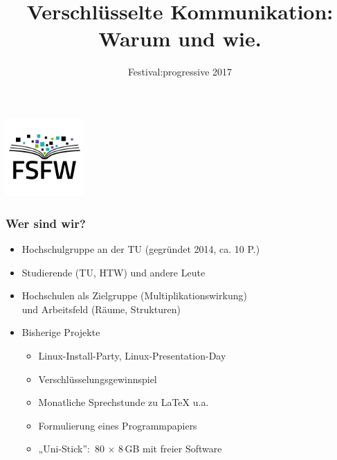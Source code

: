 \documentclass{beamer}
\title{Verschlüsselte Kommunikation: Warum und wie.}
\subtitle{Festival:progressive 2017}
\begin{document}
\begin{frame}
  \begin{center}%
    \includegraphics[width=3cm]{img-src/fsfw-logo-with-text.pdf}\\

    \vspace*{-0.5\baselineskip}

    \parbox{.95\columnwidth}{\centering\Large\inserttitle}

    \vspace*{\baselineskip}

    \structure{\large \insertsubtitle}
  \end{center}
\end{frame}

\begin{frame}[label=wb]

\begin{center}
 \vspace{10mm}
\end{center}
 
\end{frame}



\begin{frame}[label=ct1]
  \frametitle{Wer sind wir?}

  \onslide<+->

  \begin{itemize}
  \item Hochschulgruppe an der TU (gegründet 2014, ca. 10 P.)
  \item Studierende (TU, HTW) und andere Leute
  \item Hochschulen als Zielgruppe (Multiplikationswirkung)\\
    und Arbeitsfeld (Räume, Strukturen)

    \bigskip\onslide<+->

  \item Bisherige Projekte
    \begin{itemize}
    \item Linux-Install-Party, Linux-Presentation-Day
    \item Verschlüsselungsgewinnspiel
    \item Monatliche Sprechstunde zu \LaTeX{} u.a.
    \item Formulierung eines Programmpapiers
    \item „Uni-Stick”:~80 $\times$ 8\,GB mit freier Software
    \end{itemize}
  \end{itemize}
\end{frame}
\end{document}
